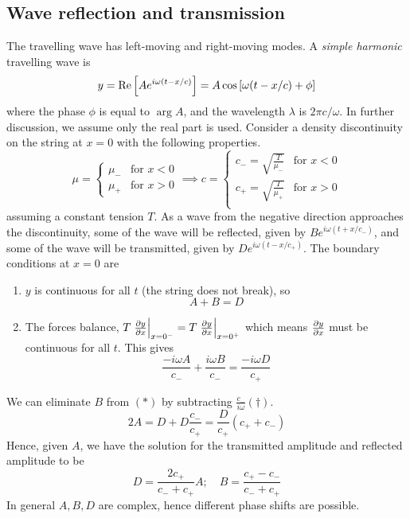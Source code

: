 \subsection{Wave reflection and transmission}
The travelling wave has left-moving and right-moving modes.
A \textit{simple harmonic} travelling wave is
\[
	y = \Re\qty[ A e^{i \omega(t-x/c)} ] = A \cos \qty[\omega(t-x/c) + \phi]
\]
where the phase \( \phi \) is equal to \( \arg A \), and the wavelength \( \lambda \) is \( 2 \pi c / \omega \).
In further discussion, we assume only the real part is used.
Consider a density discontinuity on the string at \( x = 0 \) with the following properties.
\[
	\mu = \begin{cases}
		\mu_- & \text{for } x < 0 \\
		\mu_+ & \text{for } x > 0
	\end{cases} \implies c = \begin{cases}
		c_- = \sqrt{\frac{T}{\mu_-}} & \text{for } x < 0 \\
		c_+ = \sqrt{\frac{T}{\mu_+}} & \text{for } x > 0 \\
	\end{cases}
\]
assuming a constant tension \( T \).
As a wave from the negative direction approaches the discontinuity, some of the wave will be reflected, given by \( B e^{i \omega(t + x/c_-)} \), and some of the wave will be transmitted, given by \( D e^{i \omega(t - x/c_+)} \).
The boundary conditions at \( x = 0 \) are
\begin{enumerate}
	\item \( y \) is continuous for all \( t \) (the string does not break), so
	      \begin{equation}
		      A + B = D \tag{\(\ast\)}
	      \end{equation}
	\item The forces balance, \( T \eval{\pdv{y}{x}}_{x = 0^-} = T \eval{\pdv{y}{x}}_{x = 0^+} \) which means \( \pdv{y}{x} \) must be continuous for all \( t \).
	      This gives
	      \begin{equation}
		      \frac{-i\omega A}{c_-} + \frac{i \omega B}{c_-} = \frac{-i \omega D}{c_+} \tag{\(\dagger\)}
	      \end{equation}
\end{enumerate}
We can eliminate \( B \) from \( (\ast) \) by subtracting \( \frac{c_-}{i \omega}(\dagger) \).
\[
	2A = D + D \frac{c_-}{c_+} = \frac{D}{c_+}(c_+ + c_-)
\]
Hence, given \( A \), we have the solution for the transmitted amplitude and reflected amplitude to be
\[
	D = \frac{2 c_+}{c_- + c_+} A;\quad B = \frac{c_+ - c_-}{c_- + c_+}
\]
In general \( A, B, D \) are complex, hence different phase shifts are possible.

